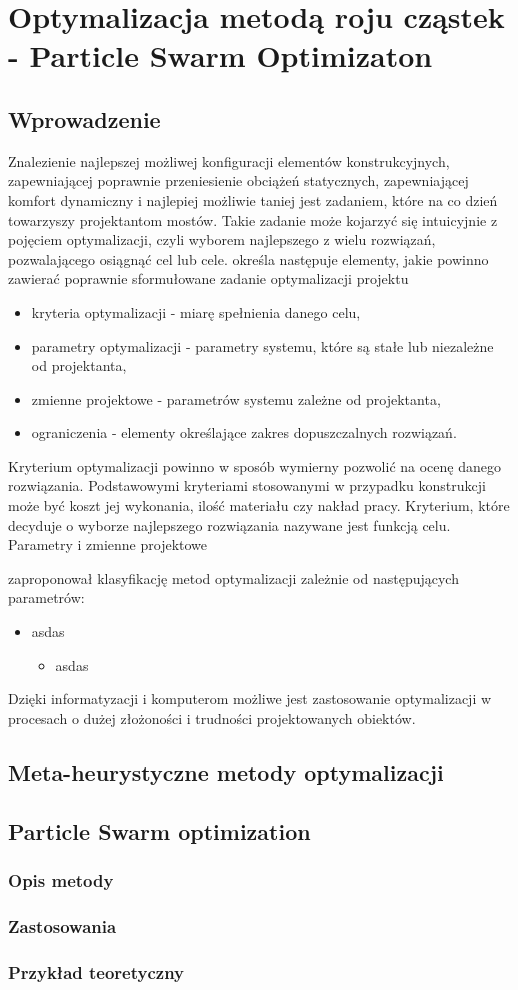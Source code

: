 \chapter{Optymalizacja metodą roju cząstek - Particle Swarm Optimizaton}
\section*{Wprowadzenie}
Znalezienie najlepszej możliwej konfiguracji elementów konstrukcyjnych, zapewniającej poprawnie przeniesienie obciążeń statycznych, zapewniającej komfort dynamiczny i najlepiej możliwie taniej jest zadaniem, które na co dzień towarzyszy projektantom mostów. Takie zadanie może kojarzyć się intuicyjnie z pojęciem optymalizacji, czyli wyborem najlepszego z wielu rozwiązań, pozwalającego osiągnąć cel lub cele. \cite{Szymczak1995} określa następuje elementy, jakie powinno zawierać poprawnie sformułowane zadanie optymalizacji projektu
\begin{itemize}[noitemsep]
	\item kryteria optymalizacji - miarę spełnienia danego celu,
	\item parametry optymalizacji - parametry systemu, które są stałe lub niezależne od projektanta, 
	\item zmienne projektowe - parametrów systemu zależne od projektanta,
	\item ograniczenia - elementy określające zakres dopuszczalnych rozwiązań. 
\end{itemize}
Kryterium optymalizacji powinno w sposób wymierny pozwolić na ocenę danego rozwiązania. Podstawowymi kryteriami stosowanymi w przypadku konstrukcji może być koszt jej wykonania, ilość materiału czy nakład pracy. Kryterium, które decyduje o wyborze najlepszego rozwiązania nazywane jest funkcją celu. Parametry i zmienne projektowe 


\cite{Tesch2016} zaproponował klasyfikację metod optymalizacji zależnie od następujących parametrów:
\begin{itemize}[noitemsep]
	\item asdas
	\begin{itemize}
		\item asdas
	\end{itemize}
\end{itemize}
Dzięki informatyzacji i komputerom możliwe jest zastosowanie optymalizacji w procesach o dużej złożoności i trudności projektowanych obiektów. 
\section{Meta-heurystyczne metody optymalizacji}
\section{Particle Swarm optimization}
\subsection{Opis metody}
\subsection{Zastosowania}
\subsection{Przykład teoretyczny}